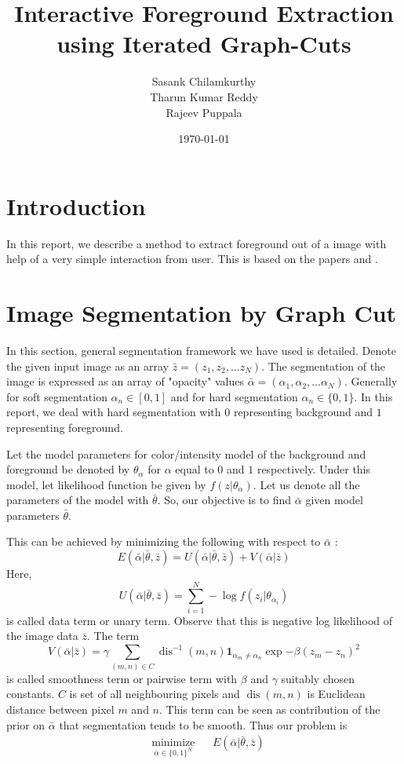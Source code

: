 \documentclass[a4paper]{article}
\begin{document}
\title{Interactive Foreground Extraction using Iterated Graph-Cuts}
\author{Sasank Chilamkurthy\\Tharun Kumar Reddy\\Rajeev Puppala}
\date{\today}
\maketitle

\section{Introduction}
In this report, we describe a method to extract foreground out of a image with help of a very simple interaction from user. This is based on the papers \cite{1} and \cite{2}.

\section{Image Segmentation by Graph Cut}
In this section, general segmentation framework we have used is detailed. Denote the given input image as an array $\bar{z} = (z_1, z_2, \dots z_N)$. 
The segmentation of the image is expressed as an array of "opacity" values $\bar{\alpha} = (\alpha_1, \alpha_2, \dots \alpha_N)$. 
Generally for soft segmentation  $\alpha_n \in [0,1]$ and for hard segmentation $\alpha_n \in \{0,1\}$. 
In this report, we deal with hard segmentation with $0$ representing background and $1$ representing foreground.

Let the model parameters for color/intensity model of the background and foreground be denoted by $\theta_\alpha$ for $\alpha$ equal to $0$ and $1$ respectively. 
Under this model, let likelihood function be given by $f(z|\theta_\alpha)$. Let us denote all the parameters of the model with $\bar{\theta}$.
So, our objective is to find $\bar{\alpha}$ given model parameters $\bar{\theta}$.

This can be achieved by minimizing the following with respect to $\bar{\alpha}$ :
\[ 
E(\bar{\alpha}| \bar{\theta},\bar{z} ) = U(\bar{\alpha}| \bar{\theta},\bar{z}) + V(\bar{\alpha}|\bar{z})
\]
Here, 
\[
U(\bar{\alpha}| \bar{\theta},\bar{z}) = \sum_{i=1}^N -\log f(z_i | \theta_{\alpha_i})
\] 
is called data term or unary term. Observe that this is negative log likelihood of the image data $\bar{z}$. The term
\[
V(\bar{\alpha}|\bar{z}) = \gamma \sum_{(m,n) \in C} \operatorname{dis}^{-1}(m,n) \mathbf{1}_{\alpha_m \neq \alpha_n} \exp{-\beta(z_m-z_n)^2}
\]
is called smoothness term or pairwise term with $\beta$ and $\gamma$ suitably chosen constants. $C$ is set of all neighbouring pixels and $\operatorname{dis}(m,n)$ is Euclidean distance between pixel $m$ and $n$.  
This term can be seen as contribution of the prior on $\bar{\alpha}$ that segmentation tends to be smooth. Thus our problem is 
\begin{equation}
\begin{aligned}
& \underset{\bar{\alpha}\in\{0,1 \}^N}{\text{minimize}}
& & E(\bar{\alpha}| \bar{\theta},\bar{z} )
\end{aligned}
\end{equation}
\end{document}
